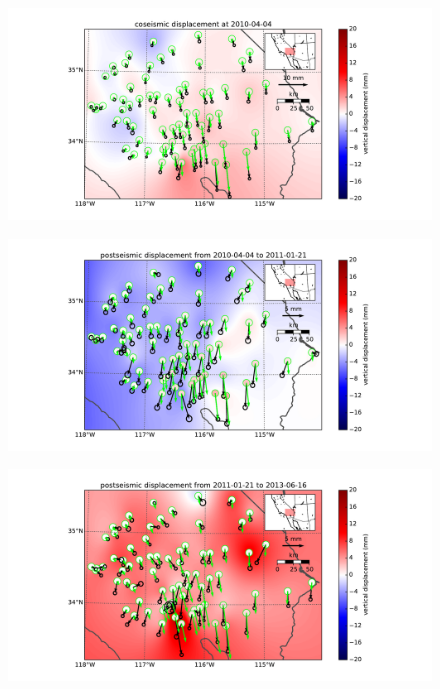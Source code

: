 \documentclass[12pt]{article}
\begin{document}
\begin{figure}
\includegraphics[scale=0.6,resolution=10]{Figures/far_field_data_1}
\centering 
\caption{}
\label{farfield1}
\end{figure}
\begin{figure}
\includegraphics[scale=0.6,resolution=10]{Figures/far_field_data_2}
\centering 
\caption{}
\label{farfield2}
\end{figure}
\begin{figure}
\includegraphics[scale=0.6,resolution=10]{Figures/far_field_data_3}
\centering 
\caption{}
\label{farfield3}
\end{figure}
\end{document}
